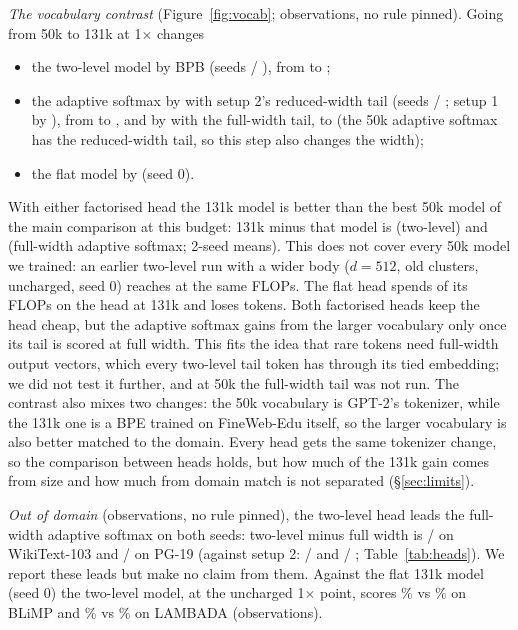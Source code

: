 \documentclass[11pt]{article}
\theoremstyle{remark}
\begin{document}
\emph{The vocabulary contrast} (Figure~\ref{fig:vocab}; observations, no rule pinned). Going from 50k to 131k at 1$\times$ changes
\begin{itemize}
  \item the two-level model by \VocTlMean{} BPB (seeds \VocTlZero{} / \VocTlOne{}), from \MainTwoMean{} to \BigTlMean{};
  \item the adaptive softmax by \VocAsMean{} with setup 2's reduced-width tail (seeds \VocAsZero{} / \VocAsOne{}; setup 1 by
  \VocAsOneMean{}), from \AsFiftyMean{} to \BigAsBMean{}, and by \VocAwMean{} with the full-width tail, to \BigAwMean{} (the 50k
  adaptive softmax has the reduced-width tail, so this step also changes the width);
  \item the flat model by \VocFlat{} (seed 0).
\end{itemize}
With either factorised head the 131k model is better than the best 50k model of the main comparison at this budget: 131k
minus that model is \TlBestFifty{} (two-level) and \AwBestFifty{} (full-width adaptive softmax; 2-seed means). This does not cover every 50k model
we trained: an earlier two-level run with a wider body ($d=512$, old clusters, uncharged, seed 0) reaches \BpbWideFifty{} at
the same FLOPs. The flat head spends \ShareFbig{} of its FLOPs on the head at 131k
and loses tokens. Both factorised heads keep the head cheap, but the adaptive softmax gains from the larger vocabulary only once
its tail is scored at full width. This fits the idea that rare tokens need full-width output vectors, which every two-level tail
token has through its tied embedding; we did not test it further, and at 50k the full-width tail was not run.
The contrast also mixes two changes: the 50k vocabulary is GPT-2's tokenizer, while the 131k one is a BPE trained on FineWeb-Edu
itself, so the larger vocabulary is also better matched to the domain. Every head gets the same tokenizer change, so the
comparison between heads holds, but how much of the 131k gain comes from size and how much from domain match is not separated
(\S\ref{sec:limits}).

\emph{Out of domain} (observations, no rule pinned), the two-level head leads the full-width adaptive softmax on both seeds:
two-level minus full width is \BigDwWikiZero{} / \BigDwWikiOne{} on WikiText-103 and \BigDwPgZero{} / \BigDwPgOne{} on PG-19
(against setup 2: \BigDWikiZero{} / \BigDWikiOne{} and \BigDPgZero{} / \BigDPgOne{}; Table~\ref{tab:heads}). We report these
leads but make no claim from them. Against the flat 131k model (seed 0) the two-level model, at the uncharged 1$\times$ point,
scores \EvHbigBlimp{}\% vs \EvFbigBlimp{}\% on BLiMP and \EvHbigLam{}\% vs \EvFbigLam{}\% on LAMBADA (observations).
\end{document}
